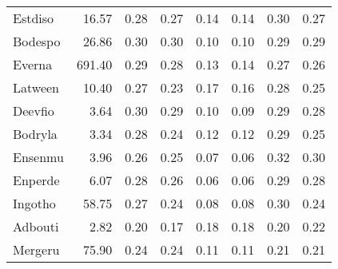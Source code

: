 \begin{table}[htbp!]
\begin{tabular}{lrrrrrrr}
Estdiso & 16.57 & 0.28 & 0.27 & 0.14 & 0.14 & 0.30 & 0.27 \\
Bodespo & 26.86 & 0.30 & 0.30 & 0.10 & 0.10 & 0.29 & 0.29 \\
Everna & 691.40 & 0.29 & 0.28 & 0.13 & 0.14 & 0.27 & 0.26 \\
Latween & 10.40 & 0.27 & 0.23 & 0.17 & 0.16 & 0.28 & 0.25 \\
Deevfio & 3.64 & 0.30 & 0.29 & 0.10 & 0.09 & 0.29 & 0.28 \\
Bodryla & 3.34 & 0.28 & 0.24 & 0.12 & 0.12 & 0.29 & 0.25 \\
Ensenmu & 3.96 & 0.26 & 0.25 & 0.07 & 0.06 & 0.32 & 0.30 \\
Enperde & 6.07 & 0.28 & 0.26 & 0.06 & 0.06 & 0.29 & 0.28 \\
Ingotho & 58.75 & 0.27 & 0.24 & 0.08 & 0.08 & 0.30 & 0.24 \\
Adbouti & 2.82 & 0.20 & 0.17 & 0.18 & 0.18 & 0.20 & 0.22 \\
Mergeru & 75.90 & 0.24 & 0.24 & 0.11 & 0.11 & 0.21 & 0.21 \\
\bottomrule
\end{tabular}
\end{table}
